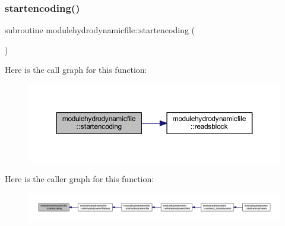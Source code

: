 \subsubsection{\texorpdfstring{startencoding()}{startencoding()}}
{\footnotesize\ttfamily subroutine modulehydrodynamicfile\+::startencoding (\begin{DoxyParamCaption}{ }\end{DoxyParamCaption})\hspace{0.3cm}{\ttfamily [private]}}

Here is the call graph for this function\+:\nopagebreak
\begin{figure}[H]
\begin{center}
\leavevmode
\includegraphics[width=350pt]{namespacemodulehydrodynamicfile_a45b05c777eb42ae5c5d23981ba6256da_cgraph}
\end{center}
\end{figure}
Here is the caller graph for this function\+:\nopagebreak
\begin{figure}[H]
\begin{center}
\leavevmode
\includegraphics[width=350pt]{namespacemodulehydrodynamicfile_a45b05c777eb42ae5c5d23981ba6256da_icgraph}
\end{center}
\end{figure}
\mbox{\label{namespacemodulehydrodynamicfile_afa04d9ff5074b735139f9addb9b466d7}} 
